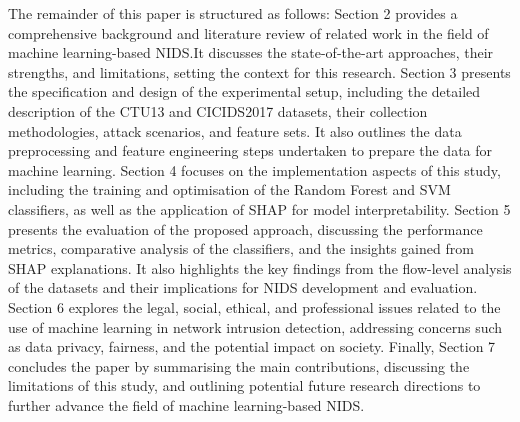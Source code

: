 The remainder of this paper is structured as follows: Section 2 provides a comprehensive background and literature review of related work in the field of machine learning-based NIDS.\@ It discusses the state-of-the-art approaches, their strengths, and limitations, setting the context for this research. Section 3 presents the specification and design of the experimental setup, including the detailed description of the CTU13 and CICIDS2017 datasets, their collection methodologies, attack scenarios, and feature sets. It also outlines the data preprocessing and feature engineering steps undertaken to prepare the data for machine learning. Section 4 focuses on the implementation aspects of this study, including the training and optimisation of the Random Forest and SVM classifiers, as well as the application of SHAP for model interpretability. Section 5 presents the evaluation of the proposed approach, discussing the performance metrics, comparative analysis of the classifiers, and the insights gained from SHAP explanations. It also highlights the key findings from the flow-level analysis of the datasets and their implications for NIDS development and evaluation. Section 6 explores the legal, social, ethical, and professional issues related to the use of machine learning in network intrusion detection, addressing concerns such as data privacy, fairness, and the potential impact on society. Finally, Section 7 concludes the paper by summarising the main contributions, discussing the limitations of this study, and outlining potential future research directions to further advance the field of machine learning-based NIDS.\@